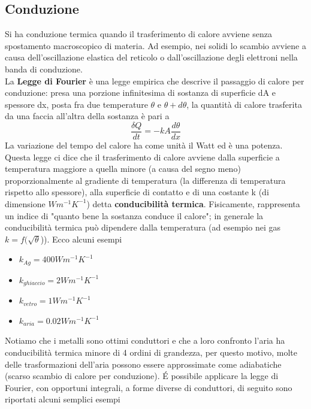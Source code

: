 \documentclass[10pt,a4paper]{article}
\begin{document}
\subsection{Conduzione}\label{sec:conduzione}
Si ha conduzione termica quando il trasferimento di calore avviene senza spostamento macroscopico di materia. Ad esempio, nei solidi lo scambio avviene a causa dell'oscillazione elastica del reticolo o dall'oscillazione degli elettroni nella banda di conduzione. \\
La \textbf{Legge di Fourier} è una legge empirica che descrive il passaggio di calore per conduzione: presa una porzione infinitesima di sostanza di superficie dA e spessore dx, posta fra due temperature $\theta$ e $\theta+d\theta$, la quantità di calore trasferita da una faccia all'altra della sostanza è pari a 
\[\frac{\delta Q}{dt}= - k A \frac{d\theta}{dx}\]
La variazione del tempo del calore ha come unità il Watt ed è una potenza. Questa legge ci dice che il trasferimento di calore avviene dalla superficie a temperatura maggiore a quella minore (a causa del segno meno) proporzionalmente al gradiente di temperatura (la differenza di temperatura rispetto allo spessore), alla superficie di contatto e di una costante k (di dimensione \(W m^{-1} K^{-1}\)) detta \textbf{conducibilità termica}. Fisicamente, rappresenta un indice di "quanto bene la sostanza conduce il calore";  in generale la conducibilità termica può dipendere dalla temperatura (ad esempio nei gas $k = f(\sqrt{\theta}$)). Ecco alcuni esempi
\begin{itemize}
	\item $k_{Ag} = 400 W m^{-1} K^{-1}$
	\item $k_{ghiaccio} = 2 W m^{-1} K^{-1}$
	\item $k_{vetro} = 1 W m^{-1} K^{-1}$
	\item $k_{aria} = 0.02 W m^{-1} K^{-1}$
\end{itemize} 
Notiamo che i metalli sono ottimi conduttori e che a loro confronto l'aria ha conducibilità termica minore di 4 ordini di grandezza, per questo motivo, molte delle trasformazioni dell'aria possono essere approssimate come adiabatiche (scarso scambio di calore per conduzione). \'{E} possibile applicare la legge di Fourier, con opportuni integrali, a forme diverse di conduttori, di seguito sono riportati alcuni semplici esempi
\end{document}
